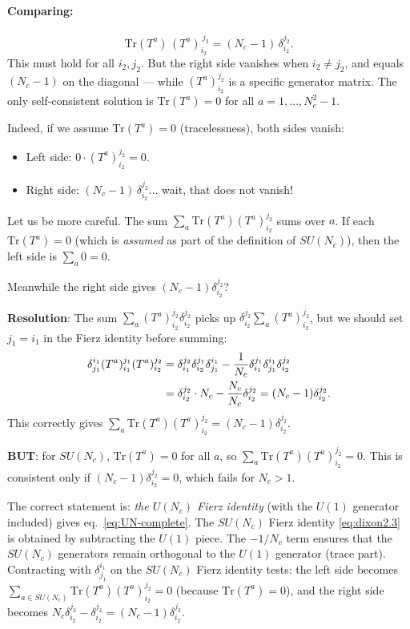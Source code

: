 \paragraph{Comparing:}
\begin{equation}
  \mathrm{Tr}(T^a)\,(T^a)_{i_2}^{\ j_2} = (N_c-1)\,\delta_{i_2}^{j_2}.
\end{equation}
This must hold for all $i_2, j_2$. But the right side vanishes when $i_2\neq j_2$, and
equals $(N_c-1)$ on the diagonal --- while $(T^a)_{i_2}^{j_2}$ is a specific generator matrix.
The only self-consistent solution is $\mathrm{Tr}(T^a)=0$ for all $a=1,\ldots,N_c^2-1$.

Indeed, if we assume $\mathrm{Tr}(T^a)=0$ (tracelessness), both sides vanish:
\begin{itemize}
  \item Left side: $0\cdot(T^a)_{i_2}^{j_2}=0$.
  \item Right side: $(N_c-1)\,\delta_{i_2}^{j_2}$... wait, that does not vanish!
\end{itemize}

Let us be more careful. The sum $\sum_a\mathrm{Tr}(T^a)(T^a)_{i_2}^{j_2}$ sums
over $a$. If each $\mathrm{Tr}(T^a)=0$ (which is \emph{assumed} as part of the
definition of $SU(N_c)$), then the left side is $\sum_a 0 = 0$.

Meanwhile the right side gives $(N_c-1)\delta_{i_2}^{j_2}$?

\textbf{Resolution}: The sum $\sum_a(T^a)_{i_2}^{j_2}\delta_{i_2}^{j_2}$
picks up $\delta_{i_2}^{j_2}\sum_a(T^a)_{i_2}^{j_2}$, but we should
set $j_1=i_1$ in the Fierz identity before summing:
\begin{align}
  \delta_{j_1}^{i_1}(T^a)_{i_1}^{j_1}(T^a)_{i_2}^{j_2}
  &= \delta_{i_1}^{j_2}\delta_{i_2}^{j_1}\delta_{j_1}^{i_1}
   - \frac{1}{N_c}\delta_{i_1}^{j_1}\delta_{j_1}^{i_1}\delta_{i_2}^{j_2}
  \notag\\
  &= \delta_{i_2}^{j_2}\cdot N_c - \frac{N_c}{N_c}\delta_{i_2}^{j_2}
   = (N_c-1)\delta_{i_2}^{j_2}.
\end{align}
This correctly gives $\sum_a\mathrm{Tr}(T^a)(T^a)_{i_2}^{j_2}=(N_c-1)\delta_{i_2}^{j_2}$.

\textbf{BUT}: for $SU(N_c)$, $\mathrm{Tr}(T^a)=0$ for all $a$, so $\sum_a\mathrm{Tr}(T^a)(T^a)_{i_2}^{j_2}=0$.
This is consistent only if $(N_c-1)\delta_{i_2}^{j_2}=0$, which fails for $N_c>1$.

The correct statement is: \emph{the $U(N_c)$ Fierz identity} (with the $U(1)$ generator included) gives eq.~\eqref{eq:UN-complete}. The $SU(N_c)$ Fierz identity \eqref{eq:dixon2.3} is obtained by subtracting the $U(1)$ piece. The $-1/N_c$ term ensures that the $SU(N_c)$ generators remain orthogonal to the $U(1)$ generator (trace part). Contracting with $\delta_{j_1}^{i_1}$ on the $SU(N_c)$ Fierz identity tests: the left side becomes $\sum_{a\in SU(N_c)}\mathrm{Tr}(T^a)(T^a)_{i_2}^{j_2}=0$ (because $\mathrm{Tr}(T^a)=0$), and the right side becomes $N_c\delta_{i_2}^{j_2}-\delta_{i_2}^{j_2}=(N_c-1)\delta_{i_2}^{j_2}$.

